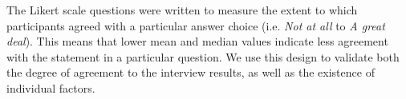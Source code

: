 The Likert scale questions were written to measure the extent to which participants agreed with a particular answer choice (i.e. \textit{Not at all} to \textit{A great deal}). This means that lower mean and median values indicate less agreement with the statement in a particular question.
We use this design to validate both the degree of agreement to the interview results, as well as the existence of individual factors.
